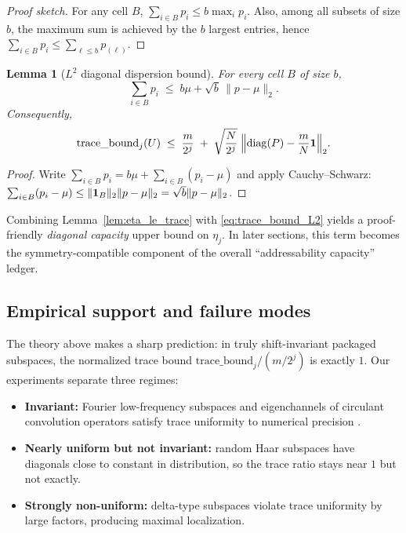 \documentclass[11pt]{article}
\theoremstyle{plain}
\newtheorem{lemma}[theorem]{Lemma}
\theoremstyle{definition}
\theoremstyle{remark}
\begin{document}
\begin{proof}[Proof sketch]
For any cell \(B\), \(\sum_{i\in B} p_i \le b \max_i p_i\).
Also, among all subsets of size \(b\), the maximum sum is achieved by the \(b\) largest entries, hence \(\sum_{i\in B}p_i \le \sum_{\ell\le b} p_{(\ell)}\).
\end{proof}

\begin{lemma}[\(L^2\) diagonal dispersion bound]\label{lem:diag_L2_bound}
For every cell \(B\) of size \(b\),
\[
\sum_{i\in B} p_i
\;\le\;
b\mu + \sqrt{b}\,\|p-\mu\|_2.
\]
Consequently,
\begin{equation}\label{eq:trace_bound_L2}
\mathrm{trace\_bound}_j(U)
\;\le\;
\frac{m}{2^j}
\;+\;
\sqrt{\frac{N}{2^j}}\;\Bigl\|\mathrm{diag}(P) - \frac{m}{N}\mathbf{1}\Bigr\|_2.
\end{equation}
\end{lemma}

\begin{proof}
Write \(\sum_{i\in B} p_i = b\mu + \sum_{i\in B}(p_i-\mu)\) and apply Cauchy--Schwarz:
\(\sum_{i\in B}(p_i-\mu) \le \|{\bf 1}_B\|_2\|p-\mu\|_2 = \sqrt{b}\|p-\mu\|_2\).
\end{proof}

Combining Lemma~\ref{lem:eta_le_trace} with \eqref{eq:trace_bound_L2} yields a proof-friendly \emph{diagonal capacity} upper bound on \(\eta_j\).
In later sections, this term becomes the symmetry-compatible component of the overall ``addressability capacity'' ledger.

\subsection{Empirical support and failure modes}\label{subsec:symmetry_empirics}

The theory above makes a sharp prediction: in truly shift-invariant packaged subspaces, the normalized trace bound
\(\mathrm{trace\_bound}_j / (m/2^j)\) is exactly \(1\).
Our experiments separate three regimes:

\begin{itemize}
  \item \textbf{Invariant:} Fourier low-frequency subspaces and eigenchannels of circulant convolution operators satisfy trace uniformity to numerical precision \cite{gray2006toeplitz}.
  \item \textbf{Nearly uniform but not invariant:} random Haar subspaces have diagonals close to constant in distribution, so the trace ratio stays near \(1\) but not exactly.
  \item \textbf{Strongly non-uniform:} delta-type subspaces violate trace uniformity by large factors, producing maximal localization.
\end{itemize}
\end{document}
